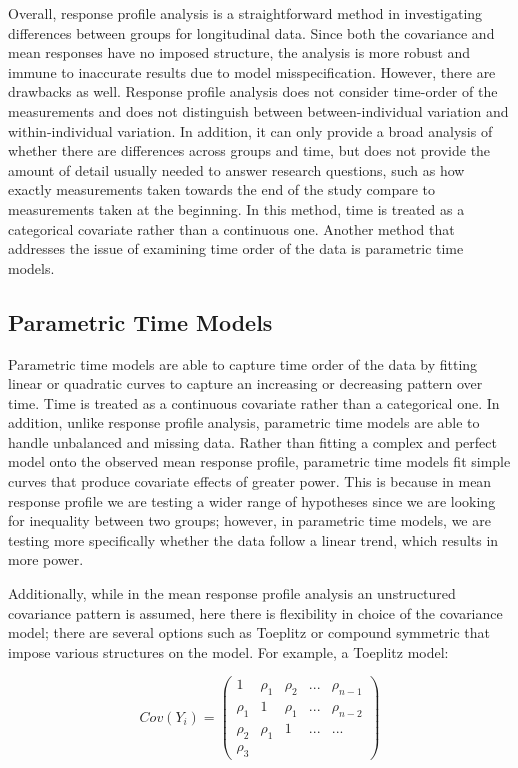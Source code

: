 \documentclass[12pt, twoside]{amherstthesis}
\begin{document}
Overall, response profile analysis is a straightforward method in investigating differences between groups for longitudinal data. Since both the covariance and mean responses have no imposed structure, the analysis is more robust and immune to inaccurate results due to model misspecification. However, there are drawbacks as well. Response profile analysis does not consider time-order of the measurements and does not distinguish between between-individual variation and within-individual variation. In addition, it can only provide a broad analysis of whether there are differences across groups and time, but does not provide the amount of detail usually needed to answer research questions, such as how exactly measurements taken towards the end of the study compare to measurements taken at the beginning. In this method, time is treated as a categorical covariate rather than a continuous one. Another method that addresses the issue of examining time order of the data is parametric time models.

\hypertarget{parametric-time-models}{%
\subsection{Parametric Time Models}\label{parametric-time-models}}

Parametric time models are able to capture time order of the data by fitting linear or quadratic curves to capture an increasing or decreasing pattern over time. Time is treated as a continuous covariate rather than a categorical one. In addition, unlike response profile analysis, parametric time models are able to handle unbalanced and missing data. Rather than fitting a complex and perfect model onto the observed mean response profile, parametric time models fit simple curves that produce covariate effects of greater power. This is because in mean response profile we are testing a wider range of hypotheses since we are looking for inequality between two groups; however, in parametric time models, we are testing more specifically whether the data follow a linear trend, which results in more power.

Additionally, while in the mean response profile analysis an unstructured covariance pattern is assumed, here there is flexibility in choice of the covariance model; there are several options such as Toeplitz or compound symmetric that impose various structures on the model. For example, a Toeplitz model:

\[Cov (Y_i) = \begin{pmatrix} 1 & \rho_1 & \rho_2 & ... & \rho_{n-1} \\ \rho_1 & 1 & \rho_1 & ... & \rho_{n-2} \\ \rho_2 & \rho_1 & 1 & ...& ... \\ \rho_3   \end{pmatrix}\]
\end{document}
